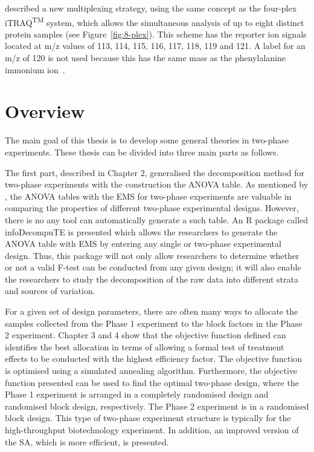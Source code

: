 \documentclass[11pt,a4paper]{article}
\begin{document}
\cite{Choe2007} described a new multiplexing strategy, using the same concept as the four-plex iTRAQ\textsuperscript{TM} system, which allows the simultaneous analysis of up to eight distinct protein samples (see Figure~\ref{fig:8-plex}). This scheme has the reporter ion signals located at m/z values of 113, 114, 115, 116, 117, 118, 119 and 121. A label for an m/z of 120 is not used because this has the same mass as the phenylalanine immonium ion~\citep{Pierce2008}.   

\section{Overview}
\label{sec:overview}
The main goal of this thesis is to develop some general theories in two-phase experiments. These thesis can be divided into three main parts as follows. 

The first part, described in Chapter 2,  generalised the decomposition method for two-phase experiments with the construction the ANOVA table. As mentioned by \cite{Brien2011}, the ANOVA tables with the EMS for two-phase experiments are valuable in comparing the properties of different two-phase experimental designs. However, there is no any tool can automatically generate a such table. An R package called infoDecompuTE is presented which allows the researchers to generate the ANOVA table with EMS by entering any single or two-phase experimental design. Thus, this package will not only allow researchers to determine whether or not a valid F-test can be conducted from any given design; it will also enable the researchers to study the decomposition of the raw data into different strata and sources of variation.

For a given set of design parameters, there are often many ways to allocate the samples collected from the Phase 1 experiment to the block factors in the Phase 2 experiment. Chapter 3 and 4 show that the objective function defined can identifies the best allocation in terms of allowing a formal test of treatment effects to be conducted with the highest efficiency factor. The objective function is optimised using a simulated annealing algorithm. Furthermore, the objective function presented can be used to find the optimal two-phase design, where the Phase 1 experiment is arranged in a completely randomised design and randomised block design, respectively. The Phase 2 experiment is in a randomised block design. This type of two-phase experiment structure is typically for the high-throughput biotechnology experiment. In addition, an improved version of the SA, which is more efficient, is presented.
\end{document}
